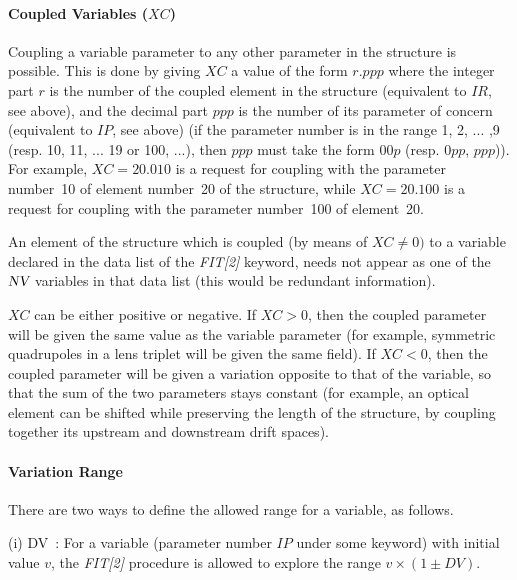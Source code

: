 \clearpage
             
\paragraph{Coupled Variables  ($XC$)} 

\noindent  Coupling a variable parameter to any other parameter in the
structure is possible. This is done by giving $XC$ a value of the form $ r.ppp $ where
the integer part $ r $ is the number of the coupled element in the structure 
(equivalent to $ IR$, see above), and the decimal part $ ppp $ is the number of its 
parameter of concern (equivalent to $ IP$,  see above) (if the parameter
number is in the range 1, 2, ... ,9 (resp. 10, 11, ... 19 or 100, ...), then $ ppp $ 
must take the form $ 00p$ (resp. $0pp$, $ppp$)). For example, $ XC=20.010 $ is a request for coupling with the
parameter number~10 of element number~20 of the structure, while $ XC=20.100 $
is a request for coupling with the parameter number~100 of element~20.  

\bigskip

\noindent An element of the structure which is coupled (by means of $ XC\not= 0) $ to a 
variable declared in the data list of the \textsl{FIT[2]} keyword, needs not appear 
as one of the $ \textsl{NV} $ variables in that data list (this would be redundant information).  

\smallskip

\noindent $ XC $ can be either positive or negative. If $ XC>0$,  then the
coupled parameter will be given the same value as the variable parameter  
(for example, symmetric 
quadrupoles in a lens triplet will be given the same field). If $ XC<0$, 
then the coupled parameter will be given a variation opposite to that of the
variable, so that the sum of the two parameters stays constant (for example, an optical 
element can be shifted while preserving the length of the structure, by coupling 
together its upstream and downstream drift spaces).  

 
\paragraph{Variation Range  } 

\noindent There are two ways to define the allowed range for a variable, as follows. 

\medskip

\noindent (i) DV~: For a variable (parameter number $ IP $ under some keyword) 
 with initial value $ v $, the \textsl{FIT[2]} procedure is
allowed to explore the range $ v\times(1\pm DV)$.   

